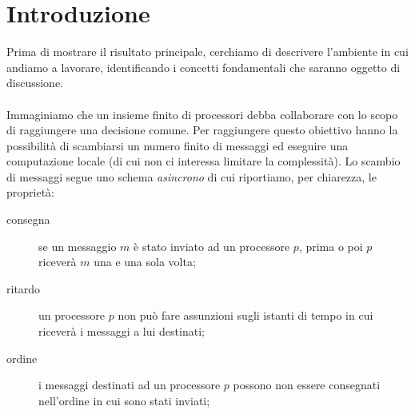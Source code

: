 \documentclass{article}
\begin{document}
\title{\rmfamily\normalfont{}}
\author{\\
	\\
	}
\date{} %

\maketitle


\begin{abstract}
  In questo lavoro ci proponiamo di studiare il risultato di
  impossibilità del consenso in un sistema totalmente asincrono,
  dimostrato da Michael J. Fischer, Nancy A. Lynch e Michael
  S. Paterson nel 1985.

  Nella nostra esposizione intendiamo riportare i principali risultati
  raggiunti dagli autori, integrando alcuni dettagli con brevi
  interventi che abbiamo sviluppato durante lo studio.

  Questo nostro elaborato è diviso in due macro sezioni: la prima ha
  un taglio più teorico e tratta la prova d'impossibilità; la
  seconda, invece, ha un taglio più implementativo e propone uno
  schema per risolvere il problema del consenso, aggiungendo alcune
  ipotesi.
\end{abstract}
       
\tableofcontents

\section{Introduzione}
\label{sec:intro}
Prima di mostrare il risultato principale, cerchiamo di descrivere
l'ambiente in cui andiamo a lavorare, identificando i concetti
fondamentali che saranno oggetto di discussione.\\\\
Immaginiamo che un insieme finito di processori debba collaborare con
lo scopo di raggiungere una decisione comune. Per raggiungere questo
obiettivo hanno la possibilità di scambiarsi un numero finito di
messaggi ed eseguire una computazione locale (di cui non ci interessa
limitare la complessità). Lo scambio di messaggi segue uno schema
\emph{asincrono} di cui riportiamo, per chiarezza, le proprietà:
\begin{description}
\item[consegna] se un messaggio $m$ è stato inviato ad un processore
  $p$, prima o poi $p$ riceverà $m$ una e una sola volta;
\item[ritardo] un processore $p$ non può fare assunzioni sugli
  istanti di tempo in cui riceverà i messaggi a lui destinati;
\item[ordine] i messaggi destinati ad un processore $p$ possono non
  essere consegnati nell'ordine in cui sono stati inviati;
\end{description}
\end{document}
